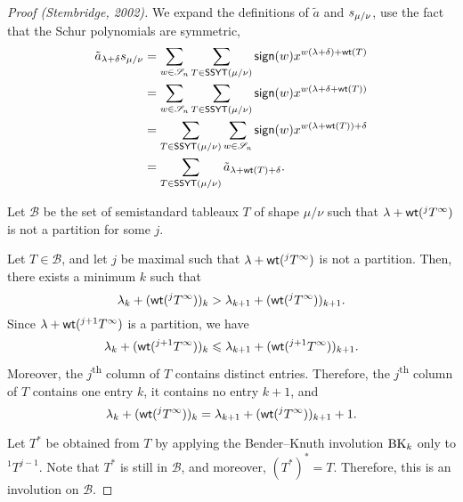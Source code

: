\begin{proof}[Proof (Stembridge, 2002)]
    We expand the definitions of \(\tilde{a}\) and \(s_{\mu/\nu}\),
    use the fact that the Schur polynomials are symmetric,
    \begin{align}
        \tilde{a}_{\lambda + \delta} s_{\mu/\nu}
        &= 
        \sum_{w \in \mathscr{S}_{n}}
        \sum_{T \in \operatorname{\mathsf{SSYT}}(\mu/\nu)}
        \operatorname{\mathsf{sign}}(w) x^{w(\lambda + \delta) + \operatorname{\mathsf{wt}}(T)} \\
        &=
        \sum_{w \in \mathscr{S}_{n}}
        \sum_{T \in \operatorname{\mathsf{SSYT}}(\mu/\nu)}
        \operatorname{\mathsf{sign}}(w) x^{w(\lambda + \delta + \operatorname{\mathsf{wt}}(T))} \\
        &=
        \sum_{T \in \operatorname{\mathsf{SSYT}}(\mu/\nu)}
        \sum_{w \in \mathscr{S}_{n}}
        \operatorname{\mathsf{sign}}(w) x^{w(\lambda + \operatorname{\mathsf{wt}}(T)) + \delta} \\
        &=
        \sum_{T \in \operatorname{\mathsf{SSYT}}(\mu/\nu)}
        \tilde{a}_{\lambda + \operatorname{\mathsf{wt}}(T) + \delta}.
    \end{align}

    Let \(\mathcal{B}\) be the set of semistandard tableaux \(T\) of shape \(\mu/\nu\) such that \(\lambda + \operatorname{\mathsf{wt}}(^jT^\infty)\) is not a partition for some \(j\).

    Let \(T \in \mathcal{B}\), and let \(j\) be maximal such that \(\lambda + \operatorname{\mathsf{wt}}(^jT^\infty)\) is not a partition.
    Then, there exists a minimum \(k\) such that
    \begin{equation}
        \lambda_k + (\operatorname{\mathsf{wt}}(^jT^\infty))_k > \lambda_{k+1} + (\operatorname{\mathsf{wt}}(^jT^\infty))_{k+1}.
    \end{equation}
    Since \(\lambda + \operatorname{\mathsf{wt}}(^{j+1}T^\infty)\) is a partition, we have
    \begin{equation}
        \lambda_k + (\operatorname{\mathsf{wt}}(^{j+1}T^\infty))_k \leqslant \lambda_{k+1} + (\operatorname{\mathsf{wt}}(^{j+1}T^\infty))_{k+1}.
    \end{equation}
    Moreover, the \(j\)\textsuperscript{th} column of \(T\) contains distinct entries.
    Therefore, the \(j\)\textsuperscript{th} column of \(T\) contains one entry \(k\), it contains no entry \(k+1\), and
    \begin{equation} \label{eq:skew-tilde-a-1}
        \lambda_k + (\operatorname{\mathsf{wt}}(^jT^\infty))_k = \lambda_{k+1} + (\operatorname{\mathsf{wt}}(^jT^\infty))_{k+1} + 1.
    \end{equation}

    Let \(T^*\) be obtained from \(T\) by applying the Bender--Knuth involution \(\operatorname{BK}_{k}\) only to \(^1T^{j-1}\).
    Note that \(T^*\) is still in \(\mathcal{B}\),
    and moreover, \((T^*)^* = T\).
    Therefore, this is an involution on \(\mathcal{B}\).


\end{proof}
